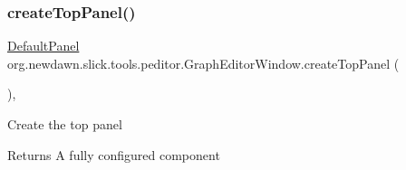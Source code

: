 \subsubsection{\texorpdfstring{create\+Top\+Panel()}{createTopPanel()}}
{\footnotesize\ttfamily \mbox{\hyperlink{classorg_1_1newdawn_1_1slick_1_1tools_1_1peditor_1_1_default_panel}{Default\+Panel}} org.\+newdawn.\+slick.\+tools.\+peditor.\+Graph\+Editor\+Window.\+create\+Top\+Panel (\begin{DoxyParamCaption}{ }\end{DoxyParamCaption})\hspace{0.3cm}{\ttfamily [inline]}, {\ttfamily [private]}}

Create the top panel

\begin{DoxyReturn}{Returns}
A fully configured component 
\end{DoxyReturn}

